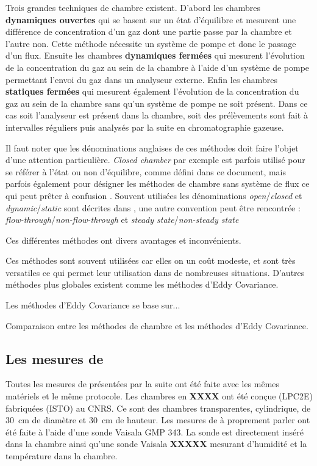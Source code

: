 Trois grandes techniques de chambre existent.
D'abord les chambres \textbf{dynamiques ouvertes} qui se basent sur un état d'équilibre et mesurent une différence de concentration d'un gaz dont une partie passe par la chambre et l'autre non. 
Cette méthode nécessite un système de pompe et donc le passage d'un flux.
Ensuite les chambres \textbf{dynamiques fermées} qui mesurent l'évolution de la concentration du gaz au sein de la chambre à l'aide d'un système de pompe permettant l'envoi du gaz dans un analyseur externe.
Enfin les chambres \textbf{statiques fermées} qui mesurent également l'évolution de la concentration du gaz au sein de la chambre sans qu'un système de pompe ne soit présent.
Dans ce cas soit l'analyseur est présent dans la chambre, soit des prélèvements sont fait à intervalles réguliers puis analysés par la suite en chromatographie gazeuse.

Il faut noter que les dénominations anglaises de ces méthodes doit faire l'objet d'une attention particulière.
\textit{Closed chamber} par exemple est parfois utilisé pour se référer à l'état ou non d'équilibre, comme défini dans ce document, mais parfois également pour désigner les méthodes de chambre sans système de flux ce qui peut prêter à confusion \cite{pumpanen2004}.
Souvent utilisées les dénominations \textit{open}/\textit{closed} et \textit{dynamic}/\textit{static} sont décrites dans \cite{luo2006161}, une autre convention peut être rencontrée : \textit{flow-through}/\textit{non-flow-through} et \textit{steady state}/\textit{non-steady state} \cite{livingston1995}

Ces différentes méthodes ont divers avantages et inconvénients.

Ces méthodes sont souvent utilisées car elles on un coût modeste, et sont très versatiles ce qui permet leur utilisation dans de nombreuses situations.
D'autres méthodes plus globales existent comme les méthodes d'Eddy Covariance.

Les méthodes d'Eddy Covariance se base sur...

Comparaison entre les méthodes de chambre et les méthodes d'Eddy Covariance.

\subsection{Les mesures de \coo}

Toutes les mesures de \coo présentées par la suite ont été faite avec les mêmes matériels et le même protocole.
Les chambres en \textbf{XXXX} ont été conçue (LPC2E) fabriquées (ISTO) au CNRS.
Ce sont des chambres transparentes, cylindrique, de \SI{30}{\centi\metre} de diamètre et \SI{30}{\centi\metre} de hauteur.
Les mesures de \coo à proprement parler ont été faite à l'aide d'une sonde Vaisala GMP 343\textregistered.
La sonde est directement inséré dans la chambre ainsi qu'une sonde Vaisala \textbf{XXXXX} mesurant d'humidité et la température dans la chambre.

